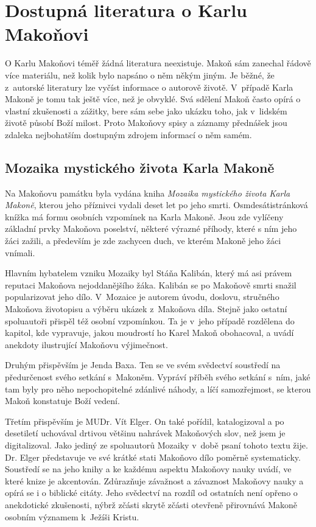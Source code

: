 \chapter{Dostupná literatura o Karlu Makoňovi}

O Karlu Makoňovi téměř žádná literatura neexistuje. Makoň sám zanechal řádově
více materiálu, než kolik bylo napsáno o něm někým jiným. Je běžné, že
z~autorské literatury lze vyčíst informace o autorově životě. V~případě Karla
Makoně je tomu tak ještě více, než je obvyklé. Svá sdělení Makoň často opírá o
vlastní zkušenosti a zážitky, bere sám sebe jako ukázku toho, jak v~lidském
životě působí Boží milost. Proto Makoňovy spisy a záznamy přednášek jsou zdaleka
nejbohatším dostupným zdrojem informací o něm samém.

\section{Mozaika mystického života Karla Makoně}

Na Makoňovu památku byla vydána
kniha \textit{Mozaika mystického života Karla Makoně}\cite{kaliban2002mozaika}, kterou
jeho příznivci vydali deset let po jeho smrti.
Osmdesátistránková knížka má formu osobních vzpomínek na Karla Makoně. Jsou zde
vylíčeny základní prvky Makoňova poselství, některé výrazné příhody, které s ním
jeho žáci zažili, a především je zde zachycen duch, ve kterém Makoně jeho žáci
vnímali.

Hlavním hybatelem vzniku Mozaiky byl Stáňa Kalibán, který má asi právem reputaci
Makoňova nejoddanějšího žáka. Kalibán se po Makoňově smrti snažil popularizovat
jeho dílo. V~Mozaice je autorem úvodu, doslovu, stručného Makoňova životopisu a
výběru ukázek z~Makoňova díla. Stejně jako ostatní spoluautoři přispěl též
osobní vzpomínkou. Ta je v~jeho případě rozdělena do kapitol, kde vypravuje, jakou
moudrostí ho Karel Makoň obohacoval, a uvádí anekdoty ilustrující Makoňovu
výjimečnost.

Druhým přispěvším je Jenda Baxa. Ten se ve svém svědectví soustředí na
předurčenost svého setkání s~Makoněm. Vypráví příběh svého setkání s~ním, jaké
tam byly pro něho nepochopitelné zdánlivé náhody, a líčí samozřejmost, se kterou
Makoň konstatuje Boží vedení.

Třetím přispěvším je MUDr. Vít Elger. On také pořídil, katalogizoval a po
desetiletí uchovával drtivou většinu nahrávek Makoňových slov, než jsem je
digitalizoval. Jako jediný ze spoluautorů Mozaiky v~době psaní tohoto textu
žije. Dr. Elger představuje ve své krátké stati Makoňovo dílo poměrně
systematicky. Soustředí se na jeho knihy a ke každému aspektu Makoňovy nauky
uvádí, ve které knize je akcentován. Zdůrazňuje závažnost a závaznost Makoňovy
nauky a opírá se i o biblické citáty. Jeho svědectví na rozdíl od ostatních není
opřeno o anekdotické zkušenosti, nýbrž zčásti skrytě zčásti otevřeně přirovnává
Makoně osobním významem k~Ježíši Kristu.

